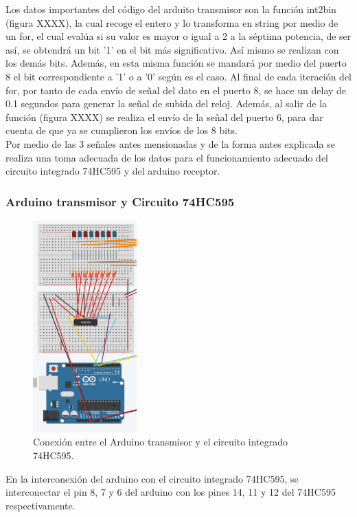 \documentclass{article}
\begin{document}
Los datos importantes del código del arduito transmisor son la función int2bin (figura XXXX), la cual recoge el entero y lo transforma en string por medio de un for, el cual evalúa si su valor es mayor o igual a 2 a la séptima potencia, de ser así, se obtendrá un bit '1' en el bit más significativo. Así mismo se realizan con los demás bits. Además, en esta misma función se mandará por medio del puerto 8 el bit correspondiente a '1' o a '0' según es el caso. Al final de cada iteración del for, por tanto de cada envío de señal del dato en el puerto 8, se hace un delay de 0.1 segundos para generar la señal de subida del reloj. Además, al salir de la función (figura XXXX) se realiza el envío de la señal del puerto 6, para dar cuenta de que ya se cumplieron los envíos de los 8 bits.\\

Por medio de las 3 señales antes mensionadas y de la forma antes explicada se realiza una toma adecuada de los datos para el funcionamiento adecuado del circuito integrado 74HC595 y del arduino receptor.\\

\subsubsection{Arduino transmisor y Circuito 74HC595}

\begin{figure}[h]
\includegraphics[width=4cm]{conexion_arduino_con_74HC595.PNG}
\centering
\caption{Conexión entre el Arduino transmisor y el circuito integrado 74HC595.}
\label{fig:conexion_arduino_con_74HC595.PNG}
\end{figure}

En la interconexión del arduino con el circuito integrado 74HC595, se interconectar el pin 8, 7 y 6 del arduino con los pines 14, 11 y 12 del 74HC595 respectivamente.
\end{document}
